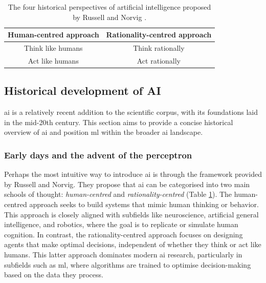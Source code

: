 \begin{table}[h]
\centering
\caption{The four historical perspectives of artificial intelligence proposed by Russell and Norvig \cite{russell_artificial_2021}.}
\label{tab:ai-approaches}
\begin{tabular}{cc}
\toprule
\textbf{Human-centred approach} & \textbf{Rationality-centred approach} \\ \midrule
Think like humans & Think rationally \\
Act like humans & Act rationally \\ \bottomrule
\end{tabular}
\end{table}

\subsection{Historical development of AI}\label{subsec:ai-history}

\Acrlong{ai} is a relatively recent addition to the scientific corpus, with its foundations laid in the mid-20th century. This section aims to provide a concise historical overview of \acrshort{ai} and position \acrlong{ml} within the broader \acrshort{ai} landscape\footnotemark.


\subsubsection{Early days and the advent of the perceptron}

Perhaps the most intuitive way to introduce \acrlong{ai} is through the framework provided by Russell and Norvig. They propose that \acrlong{ai} can be categorised into two main schools of thought: \textit{human-centred} and \textit{rationality-centred} (Table \ref{tab:ai-approaches}). The human-centred approach seeks to build systems that mimic human thinking or behavior. This approach is closely aligned with subfields like neuroscience, artificial general intelligence, and robotics, where the goal is to replicate or simulate human cognition. In contrast, the rationality-centred approach focuses on designing agents that make optimal decisions, independent of whether they think or act like humans. This latter approach dominates modern \acrshort{ai} research, particularly in subfields such as \acrlong{ml}, where algorithms are trained to optimise decision-making based on the data they process. 


